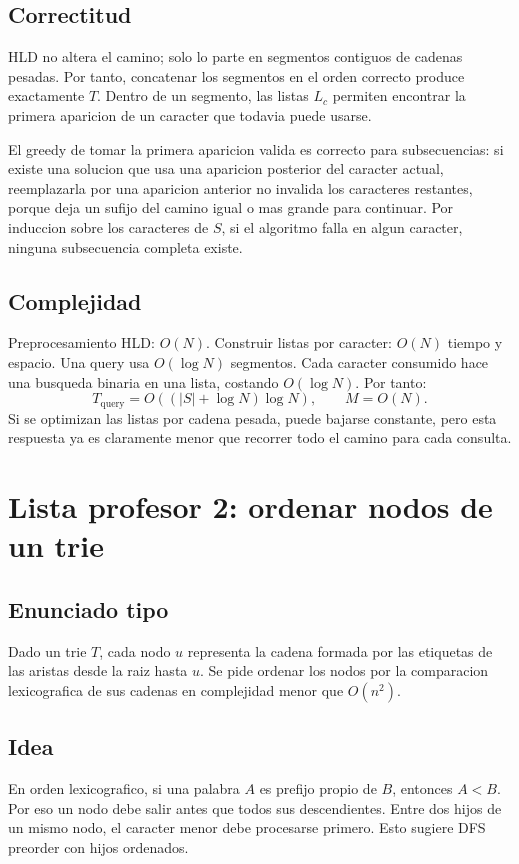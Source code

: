 \documentclass[10pt]{article}
\newcommand{\bigO}{O}
\begin{document}
\subsection{Correctitud}
HLD no altera el camino; solo lo parte en segmentos contiguos de cadenas pesadas. Por tanto, concatenar
los segmentos en el orden correcto produce exactamente \(T\). Dentro de un segmento, las listas \(L_c\)
permiten encontrar la primera aparicion de un caracter que todavia puede usarse.

El greedy de tomar la primera aparicion valida es correcto para subsecuencias: si existe una solucion que usa
una aparicion posterior del caracter actual, reemplazarla por una aparicion anterior no invalida los caracteres
restantes, porque deja un sufijo del camino igual o mas grande para continuar. Por induccion sobre los caracteres
de \(S\), si el algoritmo falla en algun caracter, ninguna subsecuencia completa existe.

\subsection{Complejidad}
Preprocesamiento HLD: \(\bigO(N)\). Construir listas por caracter: \(\bigO(N)\) tiempo y espacio.
Una query usa \(\bigO(\log N)\) segmentos. Cada caracter consumido hace una busqueda binaria en una lista,
costando \(\bigO(\log N)\). Por tanto:
\[
T_{\text{query}}=\bigO((|S|+\log N)\log N), \qquad
M=\bigO(N).
\]
Si se optimizan las listas por cadena pesada, puede bajarse constante, pero esta respuesta ya es claramente
menor que recorrer todo el camino para cada consulta.

\section{Lista profesor 2: ordenar nodos de un trie}

\subsection{Enunciado tipo}
Dado un trie \(T\), cada nodo \(u\) representa la cadena formada por las etiquetas de las aristas desde la raiz
hasta \(u\). Se pide ordenar los nodos por la comparacion lexicografica de sus cadenas en complejidad menor
que \(\bigO(n^2)\).

\subsection{Idea}
En orden lexicografico, si una palabra \(A\) es prefijo propio de \(B\), entonces \(A<B\). Por eso un nodo debe
salir antes que todos sus descendientes. Entre dos hijos de un mismo nodo, el caracter menor debe procesarse
primero. Esto sugiere DFS preorder con hijos ordenados.
\end{document}

